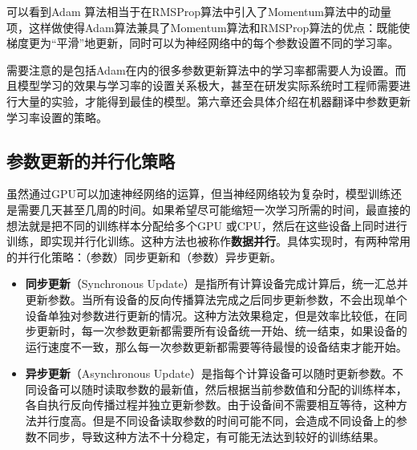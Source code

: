 \noindent 可以看到Adam 算法相当于在RMSProp算法中引入了Momentum算法中的动量项，这样做使得Adam算法兼具了Momentum算法和RMSProp算法的优点：既能使梯度更为``平滑''地更新，同时可以为神经网络中的每个参数设置不同的学习率。

\parinterval  需要注意的是包括Adam在内的很多参数更新算法中的学习率都需要人为设置。而且模型学习的效果与学习率的设置关系极大，甚至在研发实际系统时工程师需要进行大量的实验，才能得到最佳的模型。第六章还会具体介绍在机器翻译中参数更新学习率设置的策略。


\subsection{参数更新的并行化策略}

\parinterval  虽然通过GPU可以加速神经网络的运算，但当神经网络较为复杂时，模型训练还是需要几天甚至几周的时间。如果希望尽可能缩短一次学习所需的时间，最直接的想法就是把不同的训练样本分配给多个GPU 或CPU，然后在这些设备上同时进行训练，即实现并行化训练。这种方法也被称作{\small\sffamily\bfseries{数据并行}}。具体实现时，有两种常用的并行化策略：（参数）同步更新和（参数）异步更新。

\begin{itemize}
\vspace{0.5em}
\item {\small\sffamily\bfseries{同步更新}}（Synchronous Update）是指所有计算设备完成计算后，统一汇总并更新参数。当所有设备的反向传播算法完成之后同步更新参数，不会出现单个设备单独对参数进行更新的情况。这种方法效果稳定，但是效率比较低，在同步更新时，每一次参数更新都需要所有设备统一开始、统一结束，如果设备的运行速度不一致，那么每一次参数更新都需要等待最慢的设备结束才能开始。
\vspace{0.5em}
\item {\small\sffamily\bfseries{异步更新}}（Asynchronous Update）是指每个计算设备可以随时更新参数。不同设备可以随时读取参数的最新值，然后根据当前参数值和分配的训练样本，各自执行反向传播过程并独立更新参数。由于设备间不需要相互等待，这种方法并行度高。但是不同设备读取参数的时间可能不同，会造成不同设备上的参数不同步，导致这种方法不十分稳定，有可能无法达到较好的训练结果。
\vspace{0.5em}
\end{itemize}

